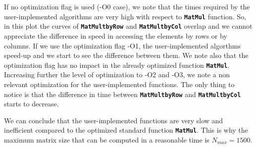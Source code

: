 \documentclass[rmp,10pt,onecolumn,fleqn,notitlepage]{revtex4-1}
\begin{document}
If no optimization flag is used (-O0 case), we note that the times required by the user-implemented algorithms are very high with respect to {\bfseries\texttt{MatMul}} function. So, in this plot the curves of {\bfseries\texttt{MatMultbyRow}} and {\bfseries\texttt{MatMultbyCol}} overlap and we cannot appreciate the difference in speed in accessing the elements by rows or by columns.
If we use the optimization flag -O1, the user-implemented algorthms speed-up and we start to see the difference between them. We note also that the optimization flag has no impact in the already optimized function {\bfseries\texttt{MatMul}}.
Increasing further the level of optimization to -O2 and -O3, we note a non relevant optimization for the user-implemented functions. The only thing to notice is that the difference in time between {\bfseries\texttt{MatMultbyRow}} and {\bfseries\texttt{MatMultbyCol}} starts to decrease.

We can conclude that the user-implemented functions are very slow and inefficient compared to the optimized standard function {\bfseries\texttt{MatMul}}. This is why the maximum matrix size that can be computed in a reasonable time is \( N_{max}=1500 \).
\end{document}
